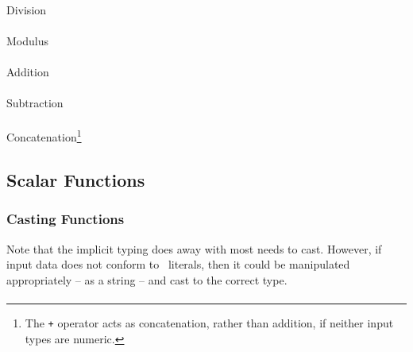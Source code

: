 \paragraph{} Division
\paragraph{} Modulus
\paragraph{} Addition
\paragraph{} Subtraction

\paragraph{} Concatenation\footnote{The
\texttt{+} operator acts as concatenation, rather than addition, if
neither input types are numeric.}

\subsection{Scalar Functions}

\subsubsection{Casting Functions}

Note that the implicit typing does away with most needs to cast.
However, if input data does not conform to \stag\ literals, then it
could be manipulated appropriately -- as a string -- and cast to the
correct type.

\paragraph{}
\paragraph{}
\paragraph{}
